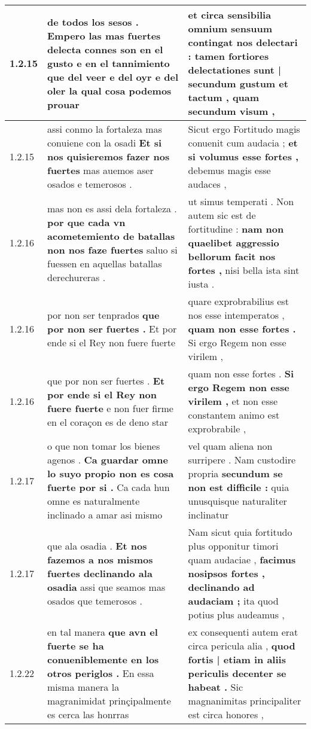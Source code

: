 \begin{tabular}{|p{1cm}|p{6.5cm}|p{6.5cm}|}
1.2.15 & de todos los sesos . \textbf{ Empero las mas fuertes delecta connes son en el gusto e en el tannimiento } que del veer e del oyr e del oler la qual cosa podemos prouar & et circa sensibilia omnium sensuum contingat nos delectari : \textbf{ tamen fortiores delectationes sunt | secundum gustum et tactum , } quam secundum visum , \\\hline
1.2.15 & assi conmo la fortaleza mas conuiene con la osadi \textbf{ Et si nos quisieremos fazer nos fuertes } mas auemos aser osados e temerosos . & Sicut ergo Fortitudo magis conuenit cum audacia ; \textbf{ et si volumus esse fortes , } debemus magis esse audaces , \\\hline
1.2.16 & mas non es assi dela fortaleza . \textbf{ por que cada vn acometemiento de batallas non nos faze fuertes } saluo si fuessen en aquellas batallas derechureras . & ut simus temperati . Non autem sic est de fortitudine : \textbf{ nam non quaelibet aggressio bellorum facit nos fortes , } nisi bella ista sint iusta . \\\hline
1.2.16 & por non ser tenprados \textbf{ que por non ser fuertes . } Et por ende si el Rey non fuere fuerte & quare exprobrabilius est nos esse intemperatos , \textbf{ quam non esse fortes . } Si ergo Regem non esse virilem , \\\hline
1.2.16 & que por non ser fuertes . \textbf{ Et por ende si el Rey non fuere fuerte } e non fuer firme en el coraçon es de deno star & quam non esse fortes . \textbf{ Si ergo Regem non esse virilem , } et non esse constantem animo est exprobrabile , \\\hline
1.2.17 & o que non tomar los bienes agenos . \textbf{ Ca guardar omne lo suyo propio non es cosa fuerte por si . } Ca cada hun omne es naturalmente inclinado a amar asi mismo & vel quam aliena non surripere . Nam custodire propria \textbf{ secundum se non est difficile : } quia unusquisque naturaliter inclinatur \\\hline
1.2.17 & que ala osadia . \textbf{ Et nos fazemos a nos mismos fuertes declinando ala osadia } assi que seamos mas osados que temerosos . & Nam sicut quia fortitudo plus opponitur timori quam audaciae , \textbf{ facimus nosipsos fortes , declinando ad audaciam ; } ita quod potius plus audeamus , \\\hline
1.2.22 & en tal manera \textbf{ que avn el fuerte se ha conueniblemente en los otros periglos . } En essa misma manera la magranimidat prinçipalmente es cerca las honrras & ex consequenti autem erat circa pericula alia , \textbf{ quod fortis | etiam in aliis periculis decenter se habeat . } Sic magnanimitas principaliter est circa honores , \\\hline

\end{tabular}
